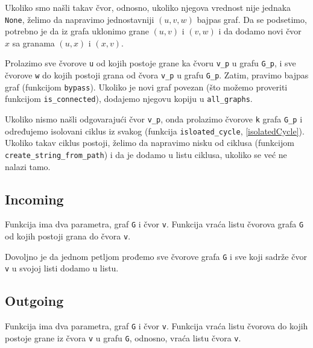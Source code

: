 Ukoliko smo našli takav čvor, odnosno, ukoliko njegova vrednost nije jednaka \texttt{None}, želimo da napravimo jednostavniji $(u, v, w)$ bajpas graf. Da se podsetimo, potrebno je da iz grafa uklonimo grane $(u, v)$ i $(v, w)$ i da dodamo novi čvor $x$ sa granama $(u, x)$ i $(x, v)$.

Prolazimo sve čvorove \texttt{u} od kojih postoje grane ka čvoru \texttt{v\_p} u grafu \texttt{G\_p}, i sve čvorove \texttt{w} do kojih postoji grana od čvora \texttt{v\_p} u grafu \texttt{G\_p}. Zatim, pravimo bajpas graf (funkcijom \texttt{bypass}). Ukoliko je novi graf povezan (što možemo proveriti funkcijom \texttt{is\_connected}), dodajemo njegovu kopiju u \texttt{all\_graphs}.

Ukoliko nismo našli odgovarajući čvor \texttt{v\_p}, onda prolazimo čvorove \texttt{k} grafa \texttt{G\_p} i određujemo isolovani ciklus iz svakog (funkcija \texttt{isloated\_cycle}, \ref{isolatedCycle}). Ukoliko takav ciklus postoji, želimo da napravimo nisku od ciklusa (funkcijom \texttt{create\_string\_from\_path}) i da je dodamo u listu ciklusa, ukoliko se već ne nalazi tamo.




\subsection{Incoming}

Funkcija ima dva parametra, graf \texttt{G} i čvor \texttt{v}. Funkcija vraća listu čvorova grafa \texttt{G} od kojih postoji grana do čvora \texttt{v}.

Dovoljno je da jednom petljom prođemo sve čvorove grafa \texttt{G} i sve koji sadrže čvor \texttt{v} u svojoj listi dodamo u listu.



\subsection{Outgoing}

Funkcija ima dva parametra, graf \texttt{G} i čvor \texttt{v}. Funkcija vraća listu čvorova do kojih postoje grane iz čvora \texttt{v} u grafu \texttt{G}, odnosno, vraća listu čvora \texttt{v}.




